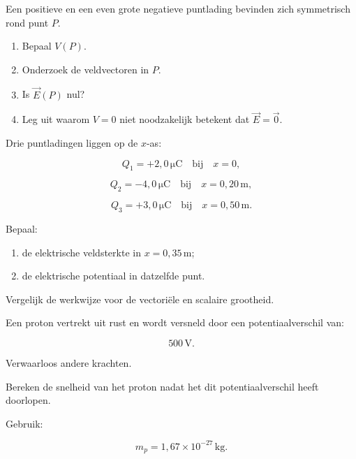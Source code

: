 \documentclass{ximera}
\begin{document}
\begin{oefening}{\oefU\ESS}

Een positieve en een even grote negatieve puntlading bevinden zich
symmetrisch rond punt $P$.

\begin{enumerate}
  \item Bepaal $V(P)$.
  \item Onderzoek de veldvectoren in $P$.
  \item Is $\vec E(P)$ nul?
  \item Leg uit waarom $V=0$ niet noodzakelijk betekent dat
        $\vec E=\vec 0$.
\end{enumerate}

\end{oefening}


\begin{oefening}{\oefU\ESS}

Drie puntladingen liggen op de $x$-as:

\[
Q_1=+2{,}0\,\mathrm{\mu C}
\quad\text{bij}\quad
x=0,
\]

\[
Q_2=-4{,}0\,\mathrm{\mu C}
\quad\text{bij}\quad
x=0{,}20\,\mathrm m,
\]

\[
Q_3=+3{,}0\,\mathrm{\mu C}
\quad\text{bij}\quad
x=0{,}50\,\mathrm m.
\]

Bepaal:

\begin{enumerate}
  \item de elektrische veldsterkte in
        $x=0{,}35\,\mathrm m$;
  \item de elektrische potentiaal in datzelfde punt.
\end{enumerate}

Vergelijk de werkwijze voor de vectoriële en scalaire grootheid.

\end{oefening}


\begin{oefening}{\oefU\ESS}

Een proton vertrekt uit rust en wordt versneld door een
potentiaalverschil van:

\[
500\,\mathrm V.
\]

Verwaarloos andere krachten.

Bereken de snelheid van het proton nadat het dit potentiaalverschil
heeft doorlopen.

Gebruik:

\[
m_p=1{,}67\times10^{-27}\,\mathrm{kg}.
\]

\end{oefening}
\end{document}
